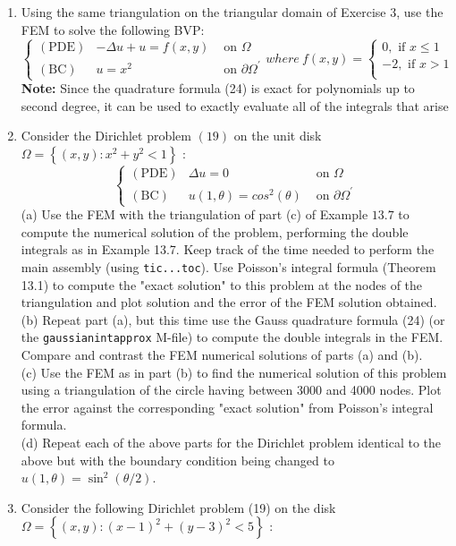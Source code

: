 \documentclass[../main.tex]{subfiles}
\begin{document}
\begin{enumerate}
	\item Using the same triangulation on the triangular domain of Exercise 3, use the FEM to solve the following BVP:
	$$
\left\{\begin{array}{lll}
(\mathrm{PDE}) & -\Delta u+u=f(x,y) & \text { on } \Omega \\
(\mathrm{BC}) & u=x^{2} & \text { on } \partial \Omega^{\prime}
\end{array}\right.
where~f(x, y)=\left\{\begin{array}{l}0, \text { if } x \leq 1 \\ -2, \text { if } x>1\\\end{array}\right.
$$
\textbf{Note:} Since the quadrature formula (24) is exact for polynomials up to second degree, it can be 
used to exactly evaluate all of the integrals that arise
	\item Consider the Dirichlet problem $(19)$ on the unit disk $\Omega=\left\{(x, y): x^{2}+y^{2}<1\right\}$ :
	$$
\left\{\begin{array}{lll}
(\mathrm{PDE}) & \Delta u=0 & \text { on } \Omega \\
(\mathrm{BC}) & u(1,\theta)=cos^{2}(\theta) & \text { on } \partial \Omega^{\prime}
\end{array}\right.
$$
(a) Use the FEM with the triangulation of part (c) of Example $13.7$ to compute the numerical solution of the problem, performing the double integrals as in Example 13.7. Keep track of the time needed to perform the main assembly (using \texttt{tic...toc}). Use Poisson's integral formula (Theorem 13.1) to compute the "exact solution" to this problem at the nodes of the triangulation and plot solution and the error of the FEM solution obtained.\\
(b) Repeat part (a), but this time use the Gauss quadrature formula (24) (or the \texttt{gaussianintapprox} M-file) to compute the double integrals in the FEM. Compare and contrast the FEM numerical solutions of parts (a) and (b).\\
(c) Use the FEM as in part (b) to find the numerical solution of this problem using a triangulation of the circle having between 3000 and 4000 nodes. Plot the error against the corresponding "exact solution" from Poisson's integral formula.\\
(d) Repeat each of the above parts for the Dirichlet problem identical to the above but with the boundary condition being changed to $u(1, \theta)=\sin ^{2}(\theta / 2)$.
	\item  Consider the following Dirichlet problem (19) on the disk $ \Omega=\left\{(x, y):(x-1)^{2}+(y-3)^{2}<5\right\}$ : 

\end{enumerate}
\end{document}

